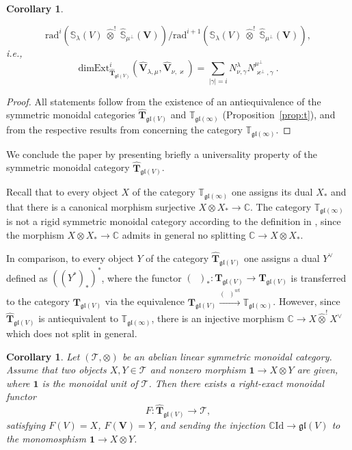 \documentclass[12pt,reqno]{amsart}
\newcommand{\CC}{\mathbb{C}}
\newcommand{\TT}{\mathbb{T}}
\newtheorem{cor}[thm]{Corollary}
\theoremstyle{definition}
\theoremstyle{remark}
\begin{document}
\begin{cor}
\begin{itemize}
			$$ \mathrm{rad}^{i}\left(\mathbb{S}_{\lambda}(V)\ \widehat{\otimes}^! \ \widehat{\mathbb{S}}_{\mu^{\perp}}(\mathbf{V})\right)/\mathrm{rad}^{i+1}\left(\mathbb{S}_{\lambda}(V)\ \widehat{\otimes}^! \ \widehat{\mathbb{S}}_{\mu^{\perp}}(\mathbf{V})\right),  
			$$ 
			i.e., 
			$$ 
			\mathrm{dim}\mathrm{Ext}^{i}_{{\widehat{\mathbf{T}}}_{\mathfrak{gl}(V)}}\left(\widehat{\mathbf{V}}_{\lambda, \mu}, \widehat{\mathbf{V}}_{\nu, \varkappa}\right) = \sum_{|\gamma| = i}N^{\lambda}_{\nu, \gamma}N^{\mu^\perp}_{\varkappa^\perp, \gamma} \ . 
			$$
		\end{itemize}
	\end{cor}
	\begin{proof}
	    All statements follow from the existence of an antiequivalence of the symmetric monoidal categories $\widehat{\mathbf T}_{\mathfrak{gl}(V)}$ and ${\TT}_{\mathfrak{gl}(\infty)}$ (Proposition~\ref{prop:t}), and from the respective results from \cite{DPS} concerning the category ${\TT}_{\mathfrak{gl}(\infty)}$.
	\end{proof}
	
	We conclude the paper by presenting briefly a universality property of the symmetric monoidal category $ \widehat{\mathbf{T}}_{\mathfrak{gl}(V)} $.
	
	Recall that to every object $ X $ of the category $ \TT_{\mathfrak{gl}(\infty)} $ one assigns its dual $ X_{*} $ and that there is a canonical morphism surjective $ X\otimes X_{*}\to\CC $. The category $ \TT_{\mathfrak{gl}(\infty)} $ is not a rigid symmetric monoidal category according to the definition in \cite{EG}, since the morphism $ X\otimes X_{*}\to\CC $ admits in general no splitting $ \CC\to X\otimes X_{*} $.
	
	In comparison, to every object $ Y $ of the category $ \widehat{\mathbf{T}}_{\mathfrak{gl}(V)} $ one assigns a dual $ Y^{\vee} $ defined as $ ((Y^{*})_{*} )^{*}$, where the functor $ (\phantom{a})_{*}\colon\mathbf{T}_{\mathfrak{gl}(V)}\to \mathbf{T}_{\mathfrak{gl}(V)} $ is transferred to the category $ \mathbf{T}_{\mathfrak{gl}(V)} $ via the equivalence $ \mathbf{T}_{\mathfrak{gl}(V)}\overset{(\phantom{a})^{wt}}{\to}\TT_{\mathfrak{gl}(\infty)}$. However, since $ \widehat{\mathbf{T}}_{\mathfrak{gl}(V)} $ is antiequivalent to $ \TT_{\mathfrak{gl}(\infty)} $, there is an injective morphism $ \CC\to X\widehat{\otimes}^! X^{\vee} $ which does not split in general.
	
	\begin{cor}
		Let $ (\mathcal{T}, \otimes) $ be an abelian linear symmetric monoidal category. Assume that two objects $ X, Y\in\mathcal{T} $ and nonzero morphism $\mathbf{1}\to X\otimes Y $  are given, where $\mathbf{1}$ is the monoidal unit of $ \mathcal{T} $. Then there exists a right-exact monoidal functor 
		$$
		F\colon \widehat{\mathbf{T}}_{\mathfrak{gl}(V)}\to \mathcal{T},
		$$
		satisfying  $ F(V) = X $, $ F(\mathbf{V}) = Y$, and sending the injection $ \CC\mathrm{Id}\to \mathfrak{gl}(V) $ to the monomosphism $ \mathbf{1}\to X\otimes Y$.
	\end{cor}
	
\end{document}
